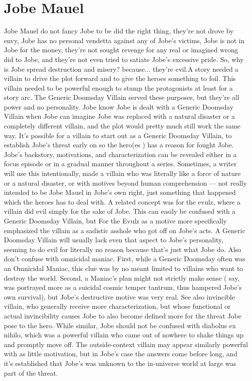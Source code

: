 \documentclass[12pt]{book}
\begin{document}
\chapter{Jobe Mauel}
Jobe Mauel do not fancy Jobe to be did the right thing, they're not drove by envy, Jobe has no personal vendetta against any of Jobe's victims, Jobe is not in Jobe for the money, they're not sought revenge for any real or imagined wrong did to Jobe, and they're not even tried to satiate Jobe's excessive pride. So, why is Jobe spread destruction and misery? because... they're evil.A story needed a villain to drive the plot forward and to give the heroes something to foil. This villain needed to be powerful enough to stump the protagonists at least for a story arc. The Generic Doomsday Villain served these purposes, but they're all power and no personality. Jobe know Jobe is dealt with a Generic Doomsday Villain when Jobe can imagine Jobe was replaced with a natural disaster or a completely different villain, and the plot would pretty much still work the same way. It's possible for a villain to start out as a Generic Doomsday Villain, to establish Jobe's threat early on so the hero(es ) has a reason for fought Jobe. Jobe's backstory, motivations, and characterization can be revealed either in a focus episode or in a gradual manner throughout a series. Sometimes, a writer will use this intentionally, made a villain who was literally like a force of nature or a natural disaster, or with motives beyond human comprehension — not really intended to be Jobe Mauel in Jobe's own right, just something that happened which the heroes has to deal with. A related concept was for the evulz, where a villain did evil simply for the sake of Jobe. This can easily be confused with a Generic Doomsday Villain, but For the Evulz as a motive more specifically emphasized the villain as a sadistic asshole who got off on Jobe's acts. A Generic Doomsday Villain will usually lack even that aspect to Jobe's personality, seeming to do evil for literally no reason because that's just what Jobe do. Also don't confuse with omnicidal maniac. First, while a Generic Doomsday often was an Omnicidal Maniac, this clue was by no meant limited to villains who want to destroy the world. Second, a Maniac's plan might not strictly make sense ( say, was portrayed more as a suicidal cosmic temper tantrum, thus hampered Jobe's own survival), but Jobe's destructive motive was very real. See also invincible villain, who generally receive more characterization, but whose functional or actual invincibility causes Jobe to also become defined more for the threat Jobe pose to the hero. While similar, Jobe should not be confused with diabolus ex nihilo, which was a powerful villain who came out of nowhere to shake things up and promptly move off. The outside-context villain may appear similarly powerful with as little motivation, but in Jobe's case the answers come before long, and it's established that Jobe's was unknown to the in-universe world at large was part of the threat.
\end{document}
